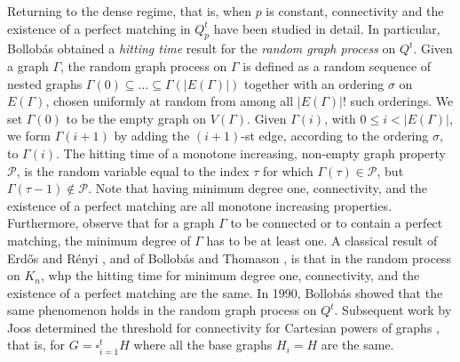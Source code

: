 \documentclass[notitlepage]{scrartcl}
\newtheorem{thm}{Theorem}[section]
\begin{document}
Returning to the dense regime, that is, when $p$ is constant, connectivity and the existence of a perfect matching in $Q^t_p$ have been studied in detail. In particular, Bollob\'as \cite{B90} obtained a \textit{hitting time} result for the \textit{random graph process} on $Q^t$. Given a graph $\Gamma$, the random graph process on $\Gamma$ is defined as a random sequence of nested graphs $\Gamma(0)\subseteq \ldots \subseteq \Gamma(|E(\Gamma)|)$ together with an ordering $\sigma$ on $E(\Gamma)$, chosen uniformly at random from among all $|E(\Gamma)|!$ such orderings. We set $\Gamma(0)$ to be the empty graph on $V(\Gamma)$. Given $\Gamma(i)$, with $0\le i < |E(\Gamma)|$, we form $\Gamma(i+1)$ by adding the $(i+1)$-st edge, according to the ordering $\sigma$, to $\Gamma(i)$. The hitting time of a monotone increasing, non-empty graph property $\mathcal{P}$, is the random variable equal to the index $\tau$ for which $\Gamma(\tau)\in \mathcal{P}$, but $\Gamma(\tau-1)\notin\mathcal{P}$. Note that having minimum degree one, connectivity, and the existence of a perfect matching are all monotone increasing properties. Furthermore, observe that for a graph $\Gamma$ to be connected or to contain a perfect matching, the minimum degree of $\Gamma$ has to be at least one. A classical result of Erd\H{o}s and R\'enyi \cite{ER66}, and of Bollob\'as and Thomason \cite{BT85}, is that in the random process on $K_n$, whp the hitting time for minimum degree one, connectivity, and the existence of a perfect matching are the same. In 1990, Bollob\'as \cite{B90} showed that the same phenomenon holds in the random graph process on $Q^t$.
Subsequent work by Joos determined the threshold for connectivity for Cartesian powers of graphs \cite{J12, J15}, that is, for $G=\square_{i=1}^tH$ where all the base graphs $H_i=H$ are the same.


\end{document}
